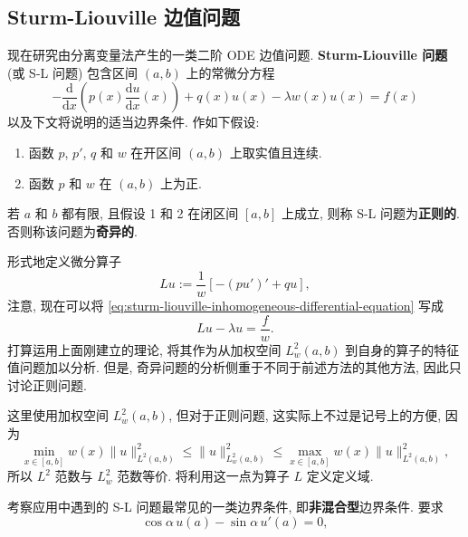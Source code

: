 \subsection{Sturm-Liouville 边值问题}\label{sec:sturm-liouville-boundary-value-problems}

现在研究由分离变量法产生的一类二阶 ODE 边值问题. \textbf{Sturm-Liouville 问题} (或 S-L 问题) 包含区间 $(a,b)$ 上的常微分方程
\begin{equation}\label{eq:sturm-liouville-inhomogeneous-differential-equation}
-\frac{\mathrm{d}}{\mathrm{d}x}\left(p(x)\frac{\mathrm{d}u}{\mathrm{d}x}(x)\right)+q(x)u(x)-\lambda w(x)u(x)=f(x)
\end{equation}
以及下文将说明的适当边界条件. 作如下假设:\begin{enumerate}\item 函数 $p$, $p\prime$, $q$ 和 $w$ 在开区间 $(a,b)$ 上取实值且连续.\item 函数 $p$ 和 $w$ 在 $(a,b)$ 上为正.\end{enumerate}若 $a$ 和 $b$ 都有限, 且假设 1 和 2 在闭区间 $[a,b]$ 上成立, 则称 S-L 问题为\textbf{正则的}. 否则称该问题为\textbf{奇异的}.

形式地定义微分算子
\begin{equation}\label{eq:sturm-liouville-weighted-differential-operator}
Lu:=\dfrac{1}{w}[-(pu')'+qu],
\end{equation}
注意, 现在可以将 \eqref{eq:sturm-liouville-inhomogeneous-differential-equation} 写成
\begin{equation}\label{eq:sturm-liouville-weighted-operator-equation}
Lu-\lambda u=\dfrac{f}{w}.
\end{equation}
打算运用上面刚建立的理论, 将其作为从加权空间 $L_w^2(a,b)$ 到自身的算子的特征值问题加以分析. 但是, 奇异问题的分析侧重于不同于前述方法的其他方法, 因此只讨论正则问题.

这里使用加权空间 $L_w^2(a,b)$, 但对于正则问题, 这实际上不过是记号上的方便, 因为
\begin{equation}\label{eq:sturm-liouville-weighted-norm-equivalence}
\min_{x\in[a,b]}w(x)\|u\|_{L^2(a,b)}^2\leq\|u\|_{L_w^2(a,b)}^2\leq\max_{x\in[a,b]}w(x)\|u\|_{L^2(a,b)}^2,
\end{equation}
所以 $L^2$ 范数与 $L_w^2$ 范数等价. 将利用这一点为算子 $L$ 定义定义域.

考察应用中遇到的 S-L 问题最常见的一类边界条件, 即\textbf{非混合型}边界条件. 要求
\begin{equation}\label{eq:sturm-liouville-left-unmixed-boundary-condition}
\cos\alpha\,u(a)-\sin\alpha\,u'(a)=0,
\end{equation}

